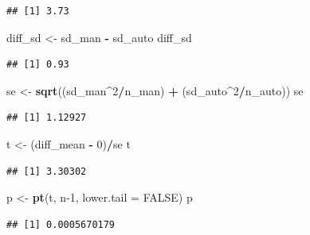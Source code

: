 \documentclass[]{article}
\newenvironment{Shaded}{\begin{snugshade}}{\end{snugshade}}
\newcommand{\DataTypeTok}[1]{\textcolor[rgb]{0.13,0.29,0.53}{#1}}
\newcommand{\DecValTok}[1]{\textcolor[rgb]{0.00,0.00,0.81}{#1}}
\newcommand{\KeywordTok}[1]{\textcolor[rgb]{0.13,0.29,0.53}{\textbf{#1}}}
\newcommand{\NormalTok}[1]{#1}
\newcommand{\OperatorTok}[1]{\textcolor[rgb]{0.81,0.36,0.00}{\textbf{#1}}}
\newcommand{\OtherTok}[1]{\textcolor[rgb]{0.56,0.35,0.01}{#1}}
\newcommand{\StringTok}[1]{\textcolor[rgb]{0.31,0.60,0.02}{#1}}
\begin{document}
\begin{verbatim}
## [1] 3.73
\end{verbatim}

\begin{Shaded}
\begin{Highlighting}[]
\NormalTok{diff_sd <-}\StringTok{ }\NormalTok{sd_man }\OperatorTok{-}\StringTok{ }\NormalTok{sd_auto}
\NormalTok{diff_sd}
\end{Highlighting}
\end{Shaded}

\begin{verbatim}
## [1] 0.93
\end{verbatim}

\begin{Shaded}
\begin{Highlighting}[]
\NormalTok{se <-}\StringTok{ }\KeywordTok{sqrt}\NormalTok{((sd_man}\OperatorTok{^}\DecValTok{2}\OperatorTok{/}\NormalTok{n_man) }\OperatorTok{+}\StringTok{ }\NormalTok{(sd_auto}\OperatorTok{^}\DecValTok{2}\OperatorTok{/}\NormalTok{n_auto))}
\NormalTok{se}
\end{Highlighting}
\end{Shaded}

\begin{verbatim}
## [1] 1.12927
\end{verbatim}

\begin{Shaded}
\begin{Highlighting}[]
\NormalTok{t <-}\StringTok{ }\NormalTok{(diff_mean }\OperatorTok{-}\StringTok{ }\DecValTok{0}\NormalTok{)}\OperatorTok{/}\NormalTok{se}
\NormalTok{t}
\end{Highlighting}
\end{Shaded}

\begin{verbatim}
## [1] 3.30302
\end{verbatim}

\begin{Shaded}
\begin{Highlighting}[]
\NormalTok{p <-}\StringTok{ }\KeywordTok{pt}\NormalTok{(t, n}\DecValTok{-1}\NormalTok{, }\DataTypeTok{lower.tail =} \OtherTok{FALSE}\NormalTok{)}
\NormalTok{p}
\end{Highlighting}
\end{Shaded}

\begin{verbatim}
## [1] 0.0005670179
\end{verbatim}
\end{document}
